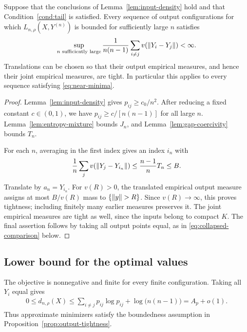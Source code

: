 \begin{proposition}\label{prop:output-tightness}
Suppose that the conclusions of Lemma~\ref{lem:input-density} hold and that Condition~\ref{cond:tail} is satisfied. Every sequence of output configurations for which $L_{n,\rho}(X,Y^{(n)})$ is bounded for sufficiently large $n$ satisfies
\begin{align}\label{eq:uniform-potential-bound}
\sup_{n\text{ sufficiently large}}\frac1{n(n-1)}\sum_{i\ne j}
v(\left\lVert Y_i-Y_j\right\rVert)<\infty.
\end{align}
Translations can be chosen so that their output empirical measures, and hence their joint empirical measures, are tight. In particular this applies to every sequence satisfying \eqref{eq:near-minima}.
\end{proposition}
\begin{proof}
Lemma~\ref{lem:input-density} gives $p_{ij}\geq c_0/n^2$. After reducing a fixed constant $c\in(0,1)$, we have $p_{ij}\geq c/[n(n-1)]$ for all large $n$. Lemma~\ref{lem:entropy-mixture} bounds $J_n$, and Lemma~\ref{lem:gap-coercivity} bounds $T_n$.

For each $n$, averaging in the first index gives an index $i_n$ with
\begin{align}\label{eq:anchor-bound}
\frac1n\sum_jv(\left\lVert Y_j-Y_{i_n}\right\rVert)\leq\frac{n-1}{n}T_n\leq B.
\end{align}
Translate by $a_n=Y_{i_n}$. For $v(R)>0$, the translated empirical output measure assigns at most $B/v(R)$ mass to $\{\left\lVert y\right\rVert>R\}$. Since $v(R)\to\infty$, this proves tightness; including finitely many earlier measures preserves it. The joint empirical measures are tight as well, since the inputs belong to compact $K$. The final assertion follows by taking all output points equal, as in \eqref{eq:collapsed-comparison} below.
\end{proof}

\subsection{Lower bound for the optimal values}\label{tsne:sec:lower_bound}
The objective is nonnegative and finite for every finite configuration. Taking all $Y_i$ equal gives
\begin{align}\label{eq:collapsed-comparison}
0\leq d_{n,\rho}(X)
\leq\sum_{i\ne j}p_{ij}\log p_{ij}+\log\bigl(n(n-1)\bigr)
=A_p+o(1).
\end{align}
Thus approximate minimizers satisfy the boundedness assumption in Proposition~\ref{prop:output-tightness}.

